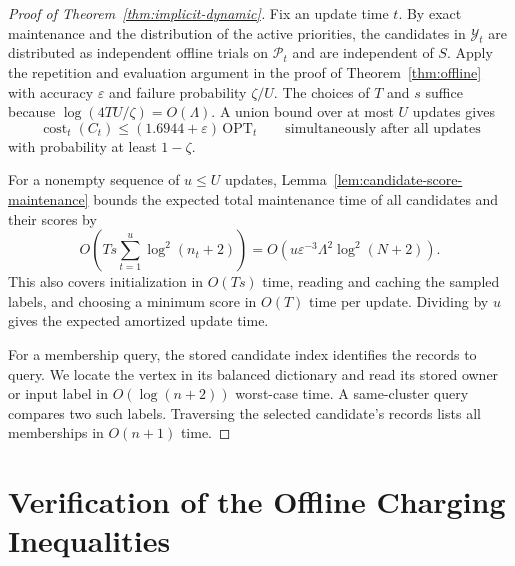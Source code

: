 \documentclass[11pt]{article}
\newif\ifusebiblatex
\theoremstyle{definition}
\theoremstyle{remark}
\newcommand{\1}{\mathbf{1}}
\begin{document}
\begin{proof}[Proof of Theorem~\ref{thm:implicit-dynamic}]
Fix an update time $t$. By exact maintenance and the distribution of
the active priorities, the candidates in $\mathcal Y_t$ are distributed
as independent offline trials on $\mathcal P_t$ and are independent
of $S$. Apply the repetition and evaluation argument in the proof of
Theorem~\ref{thm:offline} with accuracy $\varepsilon$ and failure
probability $\zeta/U$. The choices of $T$ and $s$ suffice because
$\log(4TU/\zeta)=O(\Lambda)$. A union bound over at most $U$ updates
gives
\[
    \operatorname{cost}_t(C_t)
        \leq (1.6944+\varepsilon)\,\mathrm{OPT}_t
    \qquad\text{simultaneously after all updates}
\]
with probability at least $1-\zeta$.

For a nonempty sequence of $u\leq U$ updates,
Lemma~\ref{lem:candidate-score-maintenance} bounds the expected total
maintenance time of all candidates and their scores by
\[
    O\!\left(Ts\sum_{t=1}^{u}\log^2(n_t+2)\right)
    =O\!\left(u\varepsilon^{-3}\Lambda^2\log^2(N+2)\right).
\]
This also covers initialization in $O(Ts)$ time, reading and caching
the sampled labels, and choosing a minimum score in $O(T)$ time per
update. Dividing by $u$ gives the expected amortized update time.

For a membership query, the stored candidate index identifies the
records to query. We locate the vertex in its balanced dictionary and
read its stored owner or input label in $O(\log(n+2))$ worst-case time.
A same-cluster query compares two such labels. Traversing the selected
candidate's records lists all memberships in $O(n+1)$ time.
\end{proof}
\ifusebiblatex
  \printbibliography
\else
  
  
\fi

\newpage
\appendix
\section{Verification of the Offline Charging Inequalities}
\label{app:offline-charging}
\end{document}
